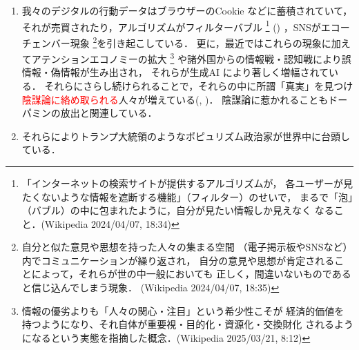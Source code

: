 \begin{enumerate}
   スマホ（のアルゴリズム）はドーパミンを継続的に大量に放出させ，
   使用者を依存症にするように作られており，
   それを作っている会社はそこから巨万の富を得ている．
   ただし，ドーパミン自体は善でも悪でもない．
   ドーパミンを上手くコントロールして，
   なりたい自分に近づいてほしい(\cite{LL})．
   
   \item
   我々のデジタルの行動データはブラウザーのCookie などに蓄積されていて，
   それが売買されたり，アルゴリズムがフィルターバブル
   \footnote{「インターネットの検索サイトが提供するアルゴリズムが，
   各ユーザーが見たくないような情報を遮断する機能」（フィルター）のせいで，
   まるで「泡」（バブル）の中に包まれたように，自分が見たい情報しか見えなく
   なること．(Wikipedia 2024/04/07, 18:34)} (\cite{P})
   ，SNSがエコーチェンバー現象
   \footnote{自分と似た意見や思想を持った人々の集まる空間
   （電子掲示板やSNSなど）内でコミュニケーションが繰り返され，
   自分の意見や思想が肯定されることによって，それらが世の中一般においても
   正しく，間違いないものであると信じ込んでしまう現象．
   (Wikipedia 2024/04/07, 18:35)}を引き起こしている．
   更に，最近ではこれらの現象に加えてアテンションエコノミーの拡大
   \footnote{情報の優劣よりも「人々の関心・注目」という希少性こそが
   経済的価値を持つようになり、それ自体が重要視・目的化・資源化・交換財化
   されるようになるという実態を指摘した概念．(Wikipedia 2025/03/21, 8:12)}
   や諸外国からの情報戦・認知戦により誤情報・偽情報が生み出され，
   それらが生成AI により著しく増幅されている．
   それらにさらし続けられることで，それらの中に所謂「真実」を見つけ
   \textcolor{red}{陰謀論に絡め取られる}人々が増えている(\cite{M1}, \cite{NKO})．
   陰謀論に惹かれることもドーパミンの放出と関連している．

   \item 
   それらによりトランプ大統領のようなポピュリズム政治家が世界中に台頭している．
    
\end{enumerate}
\emptyline

